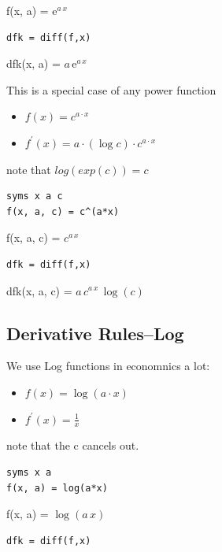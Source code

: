 \documentclass[
]{book}
\begin{document}
f(x, a) = \(\displaystyle {\mathrm{e}}^{a\,x}\)

\begin{verbatim}
dfk = diff(f,x)
\end{verbatim}

dfk(x, a) = \(\displaystyle a\,{\mathrm{e}}^{a\,x}\)

This is a special case of any power function

\begin{itemize}
\item
  \(\displaystyle f(x)=c^{a\cdot x}\)
\item
  \(\displaystyle f^{\prime } (x)=a\cdot (\log c)\cdot c^{a\cdot x}\)
\end{itemize}

note that \(log(exp(c))=c\)

\begin{verbatim}
syms x a c
f(x, a, c) = c^(a*x)
\end{verbatim}

f(x, a, c) = \(\displaystyle c^{a\,x}\)

\begin{verbatim}
dfk = diff(f,x)
\end{verbatim}

dfk(x, a, c) = \(\displaystyle a\,c^{a\,x} \,\log \left(c\right)\)

\hypertarget{derivative-ruleslog}{%
\subsection{Derivative Rules--Log}\label{derivative-ruleslog}}

We use Log functions in economnics a lot:

\begin{itemize}
\item
  \(\displaystyle f(x)=\log (a\cdot x)\)
\item
  \(\displaystyle f^{\prime } (x)=\frac{1}{x}\)
\end{itemize}

note that the c cancels out.

\begin{verbatim}
syms x a
f(x, a) = log(a*x)
\end{verbatim}

f(x, a) = \(\displaystyle \log \left(a\,x\right)\)

\begin{verbatim}
dfk = diff(f,x)
\end{verbatim}
\end{document}
